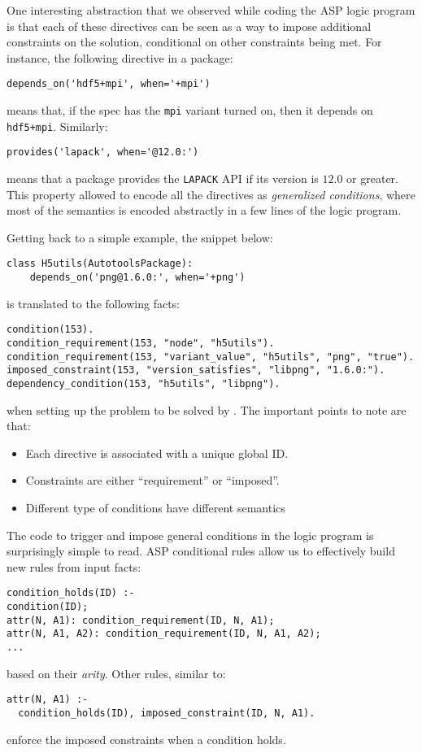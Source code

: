 One interesting abstraction that we observed while coding the ASP logic program is
that each of these directives can be seen as a way to impose additional constraints on
the solution, conditional on other constraints being met. For instance, the following
directive in a package:
%
\begin{verbatim}
depends_on('hdf5+mpi', when='+mpi')
\end{verbatim}
%
means that, if the spec has the {\tt mpi} variant turned on, then it depends on {\tt hdf5+mpi}. Similarly:
%
\begin{verbatim}
provides('lapack', when='@12.0:')
\end{verbatim}
%
means that a package provides the {\tt LAPACK} API if its version is $12.0$ or greater.
This property allowed to encode all the directives as \emph{generalized conditions}, where most of the semantics is encoded abstractly in a few lines of the logic program.

Getting back to a simple example, the snippet below:
%
\begin{verbatim}
class H5utils(AutotoolsPackage):
    depends_on('png@1.6.0:', when='+png')
\end{verbatim}
%
is translated to the following facts:
%
\begin{verbatim}
condition(153).
condition_requirement(153, "node", "h5utils").
condition_requirement(153, "variant_value", "h5utils", "png", "true").
imposed_constraint(153, "version_satisfies", "libpng", "1.6.0:").
dependency_condition(153, "h5utils", "libpng").
\end{verbatim}
%
when setting up the problem to be solved by \clingo. The important points to note are that:

\begin{itemize}
\item Each directive is associated with a unique global ID.
\item Constraints are either ``requirement'' or ``imposed''.
\item Different type of conditions have different semantics\footnotemark
\end{itemize}

The code to trigger and impose general conditions in the logic program is surprisingly simple to read. ASP conditional rules allow us to effectively build new rules from input facts:
%
\begin{verbatim}
condition_holds(ID) :-
condition(ID);
attr(N, A1): condition_requirement(ID, N, A1);
attr(N, A1, A2): condition_requirement(ID, N, A1, A2);
...
\end{verbatim}
%
based on their \emph{arity}. Other rules, similar to:
%
\begin{verbatim}
attr(N, A1) :-
  condition_holds(ID), imposed_constraint(ID, N, A1).
\end{verbatim}
%
enforce the imposed constraints when a condition holds.

